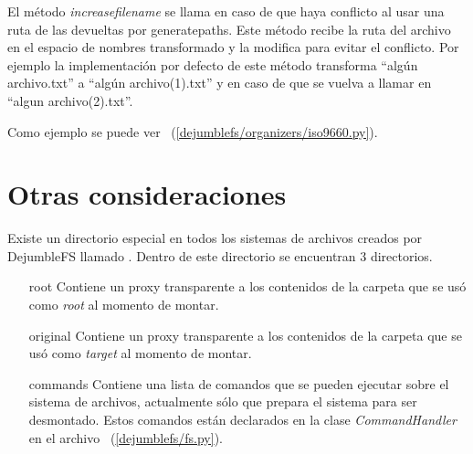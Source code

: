 El método \textit{increasefilename} se llama en caso de que haya conflicto al usar una ruta de las devueltas por generatepaths. Este método recibe la ruta del archivo en el espacio de nombres transformado y la modifica para evitar el conflicto. Por ejemplo la implementación por defecto de este método transforma ``algún archivo.txt'' a ``algún archivo(1).txt'' y en caso de que se vuelva a llamar en ``algun archivo(2).txt''.

Como ejemplo se puede ver ~(\ref{dejumblefs/organizers/iso9660.py}).


\section{Otras consideraciones}

Existe un directorio especial en todos los sistemas de archivos creados por DejumbleFS llamado . Dentro de este directorio se encuentran 3 directorios.

\begin{itemize}
\item[root] Contiene un proxy transparente a los contenidos de la carpeta que se usó como \textit{root} al momento de montar.
\item[original] Contiene un proxy transparente a los contenidos de la carpeta que se usó como \textit{target} al momento de montar.
\item[commands] Contiene una lista de comandos que se pueden ejecutar sobre el sistema de archivos, actualmente sólo  que prepara el sistema para ser desmontado. Estos comandos están declarados en la clase \textit{CommandHandler} en el archivo ~(\ref{dejumblefs/fs.py}).
\end{itemize}



